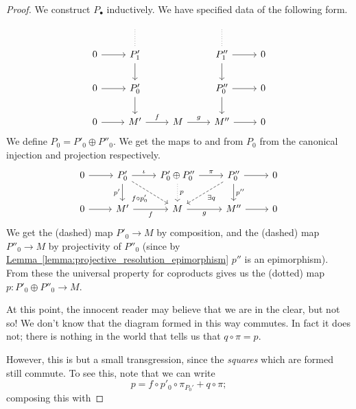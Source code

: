 \documentclass[main.tex]{subfiles}
\begin{document}
\begin{proof}
  We construct $P_{\bullet}$ inductively. We have specified data of the following form.
  \begin{equation*}
    \begin{tikzcd}
      \
      & \
      \arrow[d, dotted, no head]
      & \
      & \
      \arrow[d, dotted, no head]
      & \
      \\
      0
      \arrow[r]
      & P'_{1}
      \arrow[d]
      && P''_{1}
      \arrow[r]
      \arrow[d]
      & 0
      \\
      0
      \arrow[r]
      & P'_{0}
      \arrow[d]
      && P''_{0}
      \arrow[r]
      \arrow[d]
      & 0
      \\
      0
      \arrow[r]
      & M'
      \arrow[r, "f"]
      & M
      \arrow[r, "g"]
      & M''
      \arrow[r]
      & 0
    \end{tikzcd}
  \end{equation*}
  We define $P_{0} = P'_{0} \oplus P''_{0}$. We get the maps to and from $P_{0}$ from the canonical injection and projection respectively.
  \begin{equation*}
    \begin{tikzcd}
      0
      \arrow[r]
      & P'_{0}
      \arrow[r, "\iota"]
      \arrow[dr, dashed, swap, "f \circ p'_{0}"]
      \arrow[d, swap, "p'"]
      & P'_{0} \oplus P''_{0}
      \arrow[r, "\pi"]
      \arrow[d, dotted, "p"]
      & P''_{0}
      \arrow[r]
      \arrow[d, "p''"]
      \arrow[dl, dashed, "\exists q"]
      & 0
      \\
      0
      \arrow[r]
      & M'
      \arrow[r, swap, "f"]
      & M
      \arrow[r, swap, "g"]
      & M''
      \arrow[r]
      & 0
    \end{tikzcd}
  \end{equation*}
  We get the (dashed) map $P'_{0} \to M$ by composition, and the (dashed) map $P''_{0} \to M$ by projectivity of $P''_{0}$ (since by \hyperref[lemma:projective_resolution_epimorphism]{Lemma~\ref*{lemma:projective_resolution_epimorphism}} $p''$ is an epimorphism). From these the universal property for coproducts gives us the (dotted) map $p\colon P'_{0} \oplus P''_{0} \to M$.

  At this point, the innocent reader may believe that we are in the clear, but not so! We don't know that the diagram formed in this way commutes. In fact it does not; there is nothing in the world that tells us that $q \circ \pi = p$.

  However, this is but a small transgression, since the \emph{squares} which are formed still commute. To see this, note that we can write
  \begin{equation*}
    p = f \circ p'_{0} \circ \pi_{P_{0}'} + q \circ \pi;
  \end{equation*}
  composing this with


\end{proof}
\end{document}
